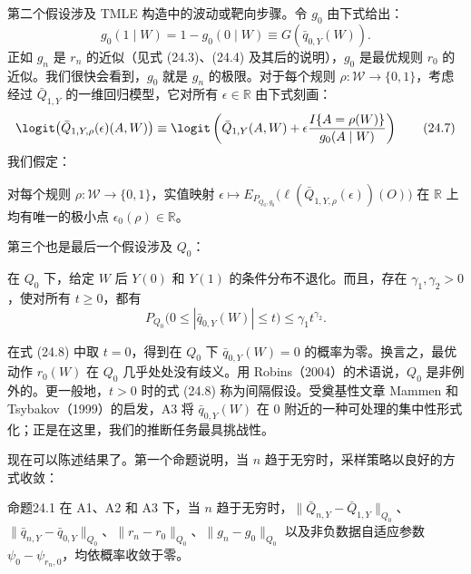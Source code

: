 第二个假设涉及 TMLE 构造中的波动或靶向步骤。令 $g_0$ 由下式给出：
\begin{equation}
 g_0(1\mid W)=1-g_0(0\mid W)\equiv G(\bar q_{0,Y}(W)).
 \tag{24.6}
\end{equation}
正如 $g_n$ 是 $r_n$ 的近似（见式 (24.3)、(24.4) 及其后的说明），$g_0$ 是最优规则 $r_0$ 的近似。我们很快会看到，$g_0$ 就是 $g_n$ 的极限。对于每个规则 $\rho:\mathcal W\to\{0,1\}$，考虑经过 $\bar Q_{1,Y}$ 的一维回归模型，它对所有 $\epsilon\in\mathbb R$ 由下式刻画：
\begin{equation}
 \logit\bigl(\bar Q_{1,Y,\rho}(\epsilon)(A,W)\bigr)
 \equiv\logit\left(\bar Q_{1,Y}(A,W)+\epsilon\frac{I\{A=\rho(W)\}}{g_0(A\mid W)}\right)
 \tag{24.7}
\end{equation}
我们假定：
\begin{description}[leftmargin=3em,labelwidth=2.5em]
\item[A2.] 对每个规则 $\rho:\mathcal W\to\{0,1\}$，实值映射 $\epsilon\mapsto E_{P_{Q_0,g_0}}\bigl(\ell(\bar Q_{1,Y,\rho}(\epsilon))(O)\bigr)$ 在 $\mathbb R$ 上均有唯一的极小点 $\epsilon_0(\rho)\in\mathbb R$。
\end{description}
第三个也是最后一个假设涉及 $Q_0$：
\begin{description}[leftmargin=3em,labelwidth=2.5em]
\item[A3.] 在 $Q_0$ 下，给定 $W$ 后 $Y(0)$ 和 $Y(1)$ 的条件分布不退化。而且，存在 $\gamma_1,\gamma_2>0$，使对所有 $t\geq0$，都有
\begin{equation}
 P_{Q_0}\bigl(0\leq|\bar q_{0,Y}(W)|\leq t\bigr)\leq\gamma_1t^{\gamma_2}.
 \tag{24.8}
\end{equation}
\end{description}
在式 (24.8) 中取 $t=0$，得到在 $Q_0$ 下 $\bar q_{0,Y}(W)=0$ 的概率为零。换言之，最优动作 $r_0(W)$ 在 $Q_0$ 几乎处处没有歧义。用 Robins（2004）的术语说，$Q_0$ 是非例外的。更一般地，$t>0$ 时的式 (24.8) 称为间隔假设。受奠基性文章 Mammen 和 Tsybakov（1999）的启发，A3 将 $\bar q_{0,Y}(W)$ 在 $0$ 附近的一种可处理的集中性形式化；正是在这里，我们的推断任务最具挑战性。

现在可以陈述结果了。第一个命题说明，当 $n$ 趋于无穷时，采样策略以良好的方式收敛：
\begin{bookresult}{命题}{24.1}
在 A1、A2 和 A3 下，当 $n$ 趋于无穷时，$\|\bar Q_{n,Y}-\bar Q_{1,Y}\|_{Q_0}$、$\|\bar q_{n,Y}-\bar q_{0,Y}\|_{Q_0}$、$\|r_n-r_0\|_{Q_0}$、$\|g_n-g_0\|_{Q_0}$ 以及非负数据自适应参数 $\psi_0-\psi_{r_n,0}$，均依概率收敛于零。
\end{bookresult}

